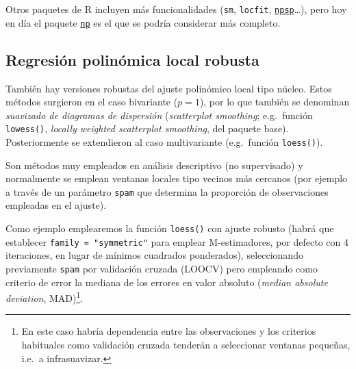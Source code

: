 \documentclass[
  spanish,
]{book}
\theoremstyle{break}
\theoremstyle{definition}
\theoremstyle{definition}
\theoremstyle{definition}
\theoremstyle{remark}
\begin{document}
Otros paquetes de R incluyen más funcionalidades (\texttt{sm}, \texttt{locfit}, \href{https://rubenfcasal.github.io/npsp}{\texttt{npsp}}\ldots), pero hoy en día el paquete \href{https://github.com/JeffreyRacine/R-Package-np}{\texttt{np}} es el que se podría considerar más completo.

\hypertarget{regresiuxf3n-polinuxf3mica-local-robusta}{%
\subsection{Regresión polinómica local robusta}\label{regresiuxf3n-polinuxf3mica-local-robusta}}

También hay versiones robustas del ajuste polinómico local tipo núcleo.
Estos métodos surgieron en el caso bivariante (\(p=1\)), por lo que también se denominan \emph{suavizado de diagramas de dispersión} (\emph{scatterplot smoothing}; e.g.~función \texttt{lowess()}, \emph{locally weighted scatterplot smoothing}, del paquete base).
Posteriormente se extendieron al caso multivariante (e.g.~función \texttt{loess()}).

Son métodos muy empleados en análisis descriptivo (no supervisado) y normalmente se emplean ventanas locales tipo vecinos más cercanos (por ejemplo a través de un parámetro \texttt{spam} que determina la proporción de observaciones empleadas en el ajuste).

Como ejemplo emplearemos la función \texttt{loess()} con ajuste robusto (habrá que establecer \texttt{family\ =\ "symmetric"} para emplear M-estimadores, por defecto con 4 iteraciones, en lugar de mínimos cuadrados ponderados), seleccionando previamente \texttt{spam} por validación cruzada (LOOCV) pero empleando como criterio de error la mediana de los errores en valor absoluto (\emph{median absolute deviation}, MAD)\footnote{En este caso habría dependencia entre las observaciones y los criterios habituales como validación cruzada tenderán a seleccionar ventanas pequeñas, i.e.~a infrasuavizar.}.
\end{document}
